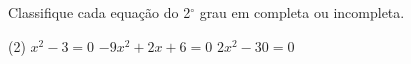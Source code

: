 \begin{question} %
Classifique cada equação do 2$^\circ$ grau em completa ou incompleta.
    \begin{tasks}(2)
       \task $x^2-3=0$
        \task $-9x^2+2x+6=0$
        \task $2x^2-30=0$
    \end{tasks}
\end{question}